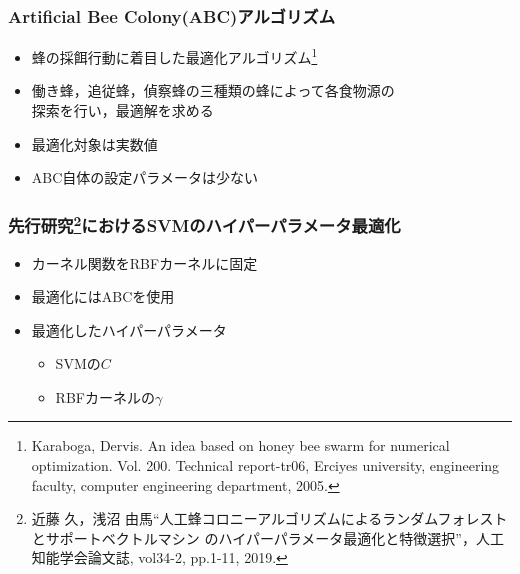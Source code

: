 \documentclass[11pt,dvipdfmx,cjk]{beamer}
\begin{document}
  \begin{frame}
    \frametitle{Artificial Bee Colony(ABC)アルゴリズム}
    \begin{itemize}
      \item 蜂の採餌行動に着目した最適化アルゴリズム\footnote{Karaboga, Dervis. An idea based on honey bee swarm for numerical optimization. Vol. 200. Technical report-tr06, Erciyes university, engineering faculty, computer engineering department, 2005.}
      \item 働き蜂，追従蜂，偵察蜂の三種類の蜂によって各食物源の\\探索を行い，最適解を求める
      \item 最適化対象は実数値
      \item ABC自体の設定パラメータは少ない
    \end{itemize}
  \end{frame}


  \begin{frame}
    \frametitle{先行研究\footnote{近藤 久，浅沼 由馬“人工蜂コロニーアルゴリズムによるランダムフォレストとサポートベクトルマシン
    のハイパーパラメータ最適化と特徴選択”，人工知能学会論文誌, vol34-2, pp.1-11, 2019.}におけるSVMのハイパーパラメータ最適化}
    \begin{itemize}
      \item カーネル関数をRBFカーネルに固定
      \item  最適化にはABCを使用
      \item 最適化したハイパーパラメータ
      \begin{itemize}
        \item SVMの$C$
        \item RBFカーネルの$\gamma$
      \end{itemize}
    \end{itemize}
\end{frame}
\end{document}
